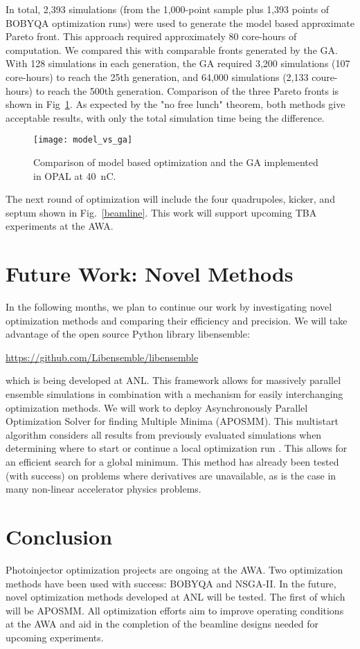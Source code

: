 \documentclass[letterpaper,  %
              ]{jacow-2_3}   %
\begin{document}
In total, 2,393 simulations (from the 1,000-point sample plus 
1,393 points of  BOBYQA optimization runs) were used to
generate the model based approximate Pareto front. 
This approach required approximately 80 core-hours of computation. 
We compared this with comparable fronts generated by the GA.
With 128 simulations in each generation, the GA required 3,200 
simulations (107 core-hours) to reach the 25th generation, and 64,000 simulations
(2,133 coure-hours) to reach the 500th generation. 
Comparison of the three Pareto fronts is shown in Fig~\ref{compare}.
As expected by the "no free lunch" theorem, both methods give 
acceptable results, with only the total simulation time being 
the difference. 
\begin{figure}
	\texttt{[image: model\_vs\_ga]}
	\caption{Comparison of model based optimization and the GA implemented in OPAL at \SI{40}{nC}. }
	\label{compare}
\end{figure}

The next round of optimization will include the four quadrupoles, 
kicker, and septum shown in Fig.~\ref{beamline}. This work 
will support upcoming TBA experiments at the AWA.

\section{Future Work: Novel Methods}
In the following months, we plan to continue our work 
by investigating novel optimization methods and comparing their efficiency and precision. 
We will take advantage of the 
open source Python library libensemble:
\begin{center}
	\url{https://github.com/Libensemble/libensemble}
\end{center} 
which is being developed at ANL.
This framework allows for massively parallel ensemble simulations in 
combination with a mechanism for easily interchanging optimization methods. 
We will work to deploy Asynchronously Parallel Optimization Solver for finding Multiple Minima (APOSMM).
This multistart algorithm considers all results from previously evaluated simulations when determining where to start or continue a local optimization run \cite{jeff}. This allows for an efficient 
search for a global minimum. This method has already been tested
(with success) on problems where derivatives are unavailable, 
as is the case in many non-linear accelerator physics problems. 


\section{Conclusion}
Photoinjector optimization projects are ongoing at the AWA.
Two optimization methods have been used with success:
BOBYQA and NSGA-II. In the future, novel optimization 
methods developed at ANL will be tested. The first of 
which will be APOSMM. All optimization efforts aim to improve operating conditions at the AWA and 
aid in the completion of the beamline designs needed for upcoming experiments.
\end{document}
